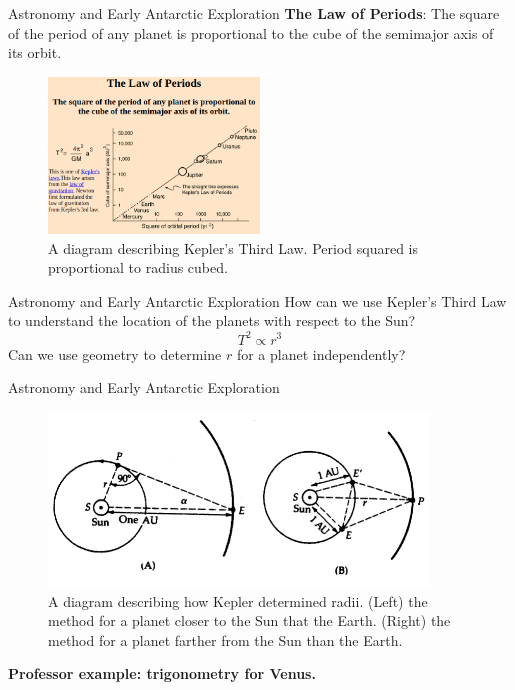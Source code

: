 \documentclass{beamer}
\begin{document}
\begin{frame}{Astronomy and Early Antarctic Exploration}
\small
\textbf{The Law of Periods}: The square of the period of any planet is proportional to the cube of the semimajor axis of its orbit.
\begin{figure}
\centering
\includegraphics[width=0.5\textwidth]{figures/orbit3.png}
\caption{\label{fig:orbit3} A diagram describing Kepler's Third Law.  Period squared is proportional to radius cubed.}
\end{figure}
\end{frame}

\begin{frame}{Astronomy and Early Antarctic Exploration}
\small
How can we use Kepler's Third Law to understand the location of the planets with respect to the Sun?
\begin{equation}
T^2 \propto r^3
\end{equation}
Can we use geometry to determine $r$ for a planet independently?
\end{frame}

\begin{frame}{Astronomy and Early Antarctic Exploration}
\small
\begin{figure}
\centering
\includegraphics[width=0.9\textwidth]{figures/orbit4.png}
\caption{\label{fig:orbit4} A diagram describing how Kepler determined radii.  (Left) the method for a planet closer to the Sun that the Earth.  (Right) the method for a planet farther from the Sun than the Earth.}
\end{figure}
\textbf{Professor example: trigonometry for Venus.}
\end{frame}
\end{document}
